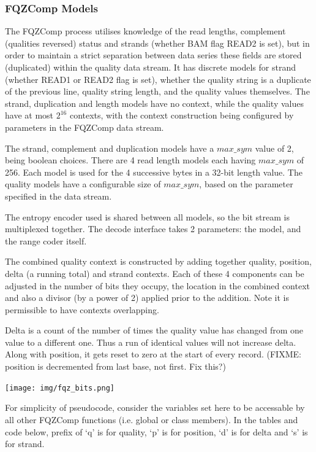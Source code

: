 \documentclass[a4paper]{article}
\begin{document}
\subsubsection*{FQZComp Models}

The FQZComp process utilises knowledge of the read lengths, complement
(qualities reversed) status and strands (whether BAM flag READ2 is
set), but in order to maintain a strict separation between data series
these fields are stored (duplicated) within the quality data stream.
It has discrete models for strand (whether READ1 or READ2 flag is
set), whether the quality string is a duplicate of the previous line,
quality string length, and the quality values themselves.  The strand,
duplication and length models have no context, while the quality
values have at most $2^{16}$ contexts, with the context construction
being configured by parameters in the FQZComp data stream.

The strand, complement and duplication models have a $max\_sym$ value
of 2, being boolean choices.  There are 4 read length models each
having $max\_sym$ of 256.  Each model is used for the 4 successive
bytes in a 32-bit length value.  The quality models have a
configurable size of $max\_sym$, based on the parameter specified in
the data stream.

The entropy encoder used is shared between all models, so the bit
stream is multiplexed together.  The decode interface takes 2
parameters: the model, and the range coder itself.

The combined quality context is constructed by adding together
quality, position, delta (a running total) and strand contexts.
Each of these 4 components can be adjusted in the number of bits they
occupy, the location in the combined context and also a divisor (by
a power of 2) applied prior to the addition.  Note it is permissible
to have contexts overlapping.

Delta is a count of the number of times the quality value has changed
from one value to a different one.  Thus a run of identical values
will not increase delta.  Along with position, it gets reset to zero
at the start of every record.  (FIXME: position is decremented from
last base, not first.  Fix this?)

\texttt{[image: img/fqz\_bits.png]}

For simplicity of pseudocode, consider the variables set
here to be accessable by all other FQZComp functions (i.e. global or
class members).  In the tables and code below, prefix of `q' is for
quality, `p' is for position, `d' is for delta and `s' is for strand.
\end{document}
